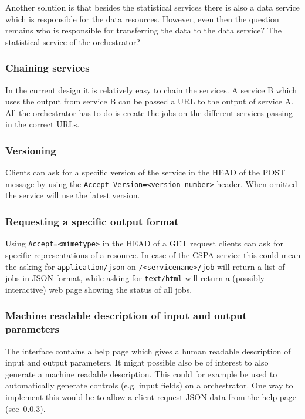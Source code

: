\documentclass[a4paper]{article}
\begin{document}
Another solution is that besides the statistical services there is also a data
service which is responsible for the data resources. However, even then the
question remains who is responsible for transferring the data to the data
service? The statistical service of the orchestrator? 

\subsubsection{Chaining services}
In the current design it is relatively easy to chain the services. A service B
which uses the output from service B can be passed a URL to the output of
service A. All the orchestrator has to do is create the jobs on the different
services passing in the correct URLs. 

\subsubsection{Versioning}
Clients can ask for a specific version of the service in the HEAD of the POST
message by using the \texttt{Accept-Version=<version number>} header. When
omitted the service will use the latest version.


\subsubsection{Requesting a specific output format}
\label{sec:outputformat}
Using \texttt{Accept=<mimetype>} in the HEAD of a GET request clients can ask for
specific representations of a resource. In case of the CSPA service this could
mean the asking for \texttt{application/json} on \texttt{/<servicename>/job}
will return a list of jobs in JSON format, while asking for \texttt{text/html}
will return a (possibly interactive) web page showing the status of all jobs.


\subsubsection{Machine readable description of input and output parameters}
The interface contains a help page which gives a human readable description of
input and output parameters. It might possible also be of interest to also
generate a machine readable description. This could for example be used to
automatically generate controls (e.g. input fields) on a orchestrator. One way
to implement this would be to allow a client request JSON data from the help
page (see~\ref{sec:outputformat}). 
\end{document}
